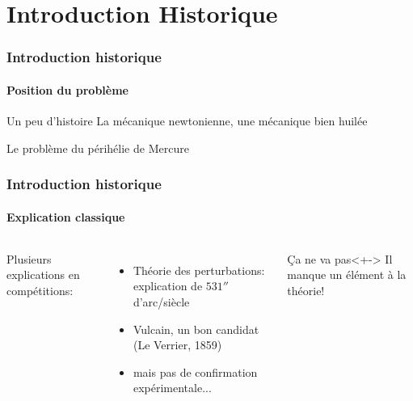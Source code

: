 \section[Intro]{Introduction Historique}

\begin{frame}
	\frametitle{Introduction historique}
	\framesubtitle{Position du problème}

	\begin{block}{Un peu d'histoire}
		La mécanique newtonienne, une mécanique bien huilée
	\end{block}

	\pause

	\begin{alertblock}{Le problème du périhélie de Mercure}
		\pause
		\begin{figure}
		\end{figure}
	\end{alertblock}

\end{frame}


\begin{frame}
	\frametitle{Introduction historique}
	\framesubtitle{Explication classique}

	\begin{columns}
			Plusieurs explications en compétitions:

			\pause

			\begin{itemize}[<+->]
				\item		Théorie des perturbations: explication de $531''$ d'arc/siècle
				\item		Vulcain, un bon candidat (Le Verrier, 1859)
				\item		mais pas de confirmation expérimentale...

			\end{itemize}



			\begin{alertblock}{Ça ne va pas}<+->
				Il manque un élément à la théorie!
			\end{alertblock}

	\end{columns}

\end{frame}


